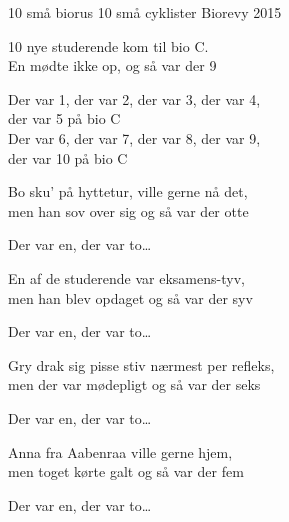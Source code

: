 \begin{song}{10 små biorus}{}
  {10 små cyklister}
  {}
  {Biorevy 2015}
  {\NotCCLIed}

  \begin{SBVerse}
  10 nye studerende kom til bio C.\\
  En mødte ikke op, og så var der 9\\
  \end{SBVerse}

  \begin{SBChorus}
  Der var 1, der var 2, der var 3, der var 4,\\
  der var 5 på bio C\\
  Der var 6, der var 7, der var 8, der var 9,\\
  der var 10 på bio C
  \end{SBChorus}

  \begin{SBVerse}
  Bo sku' på hyttetur, ville gerne nå det,\\
  men han sov over sig og så var der otte
  \end{SBVerse}
  \begin{SBChorus}
  Der var en, der var to\ldots
  \end{SBChorus}

  \begin{SBVerse}
  En af de studerende var eksamens-tyv,\\
  men han blev opdaget og så var der syv
  \end{SBVerse}
  \begin{SBChorus}
  Der var en, der var to\ldots
  \end{SBChorus}

  \begin{SBVerse}
  Gry drak sig pisse stiv nærmest per refleks,\\
  men der var mødepligt og så var der seks
  \end{SBVerse}
  \begin{SBChorus}
  Der var en, der var to\ldots
  \end{SBChorus}

  \begin{SBVerse}
  Anna fra Aabenraa ville gerne hjem,\\
  men toget kørte galt og så var der fem
  \end{SBVerse}
  \begin{SBChorus}
  Der var en, der var to\ldots
  \end{SBChorus}


\end{song}
